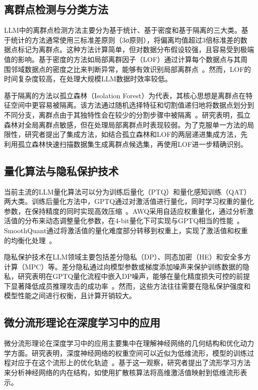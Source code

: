 \subsection{离群点检测与分类方法}

LLM中的离群点检测方法主要分为基于统计、基于密度和基于隔离的三大类。基于统计的方法通常使用三标准差原则（3σ原则），将偏离均值超过3倍标准差的数据点标记为离群点。这种方法计算简单，但对数据分布假设较强，且容易受到极端值的影响。基于密度的方法如局部离群因子（LOF）通过计算每个数据点与其周围邻域数据点的密度之比来判断异常，能够有效识别局部离群点~\cite{lof_algorithm}。然而，LOF的时间复杂度较高，在处理大规模LLM数据时效率较低。

基于隔离的方法以孤立森林（Isolation Forest）为代表，其核心思想是离群点在特征空间中更容易被隔离。该方法通过随机选择特征和切割值递归地将数据点划分到不同分支，离群点由于其独特性会在较少的分割步骤中被隔离~\cite{isolation_forest}。研究表明，孤立森林对全局离群点敏感，但在处理局部离群点时表现较弱。为了克服单一方法的局限性，研究者提出了集成方法，如结合孤立森林和LOF的两层递进集成方法，先利用孤立森林快速扫描数据集生成离群点候选集，再使用LOF进一步精确识别。

\subsection{量化算法与隐私保护技术}

当前主流的LLM量化算法可以分为训练后量化（PTQ）和量化感知训练（QAT）两大类。训练后量化方法中，GPTQ通过对激活值进行量化，同时学习权重的量化参数，在保持精度的同时实现高效压缩~\cite{gptq_paper}。AWQ采用自适应权重量化，通过分析激活值的分布来动态调整量化参数，在4-bit量化下可实现与GPTQ相当的性能~\cite{awq_paper}。SmoothQuant通过将激活值的量化难度部分转移到权重上，实现了激活值和权重的均衡化处理~\cite{smoothquant_paper}。

隐私保护技术在LLM领域主要包括差分隐私（DP）、同态加密（HE）和安全多方计算（MPC）等。差分隐私通过向模型参数或梯度添加噪声来保护训练数据的隐私，研究表明在GPTQ量化流程中嵌入DP噪声，能够在量化精度损失可控的前提下显著降低成员推理攻击的成功率~\cite{differential_privacy}。然而，这些方法往往需要在隐私保护强度和模型性能之间进行权衡，且计算开销较大。

\subsection{微分流形理论在深度学习中的应用}

微分流形理论在深度学习中的应用主要集中在理解神经网络的几何结构和优化动力学方面。研究表明，深度神经网络的权重空间可以近似为低维流形，模型的训练过程对应于在这个流形上的优化轨迹~\cite{manifold_learning}。基于这一观察，研究者提出了流形学习方法来分析神经网络的内在结构，如使用扩散核算法将高维激活值映射到低维流形表示。

